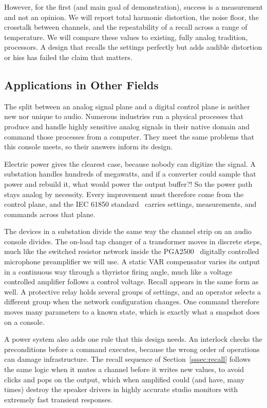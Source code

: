 \documentclass[11pt, letterpaper,titlepage]{article}
\begin{document}
However, for the first (and main goal of demonstration), success is a measurement and not an opinion. We will report total harmonic
distortion, the noise floor, the crosstalk between channels, and the
repeatability of a recall across a range of temperature. We will compare these values to existing, fully analog tradition, processors. A design that recalls the settings
perfectly but adds audible distortion or hiss has failed the claim that matters.

\subsection{Applications in Other Fields}
\label{ssec:other-fields}

The split between an analog signal plane and a digital control plane is neither
new nor unique to audio. Numerous industries run a physical processes that produce and handle highly sensitive analog signals in their native
domain and command those processes from a computer. They meet the same problems
that this console meets, so their answers inform its design.

Electric power gives the clearest case, because nobody can digitize the signal.
A substation handles hundreds of megawatts, and if a converter could sample that power
and rebuild it, what would power the output buffer?! So the power path stays analog by necessity. Every improvement
must therefore come from the control plane, and the IEC 61850 standard~\cite{iec61850} carries
settings, measurements, and commands across that plane.

The devices in a substation divide the same way the channel strip on an audio console divides. The
on-load tap changer of a transformer moves in discrete steps, much like the
switched resistor network inside the PGA2500~\cite{pga2500} digitally controlled microphone preamplifier we will use.
A static VAR compensator varies its output in a continuous way through a
thyristor firing angle, much like a voltage controlled amplifier follows a
control voltage. Recall appears in the same form as well. A protective relay
holds several groups of settings, and an operator selects a different group when
the network configuration changes. One command therefore moves many parameters
to a known state, which is exactly what a snapshot does on a console.

A power system also adds one rule that this design needs. An interlock checks
the preconditions before a command executes, because the wrong order of
operations can damage infrastructure. The recall sequence of Section~\ref{sssec:recall}
follows the same logic when it mutes a channel before it writes new values, to avoid clicks and pops on the output, which when amplified could (and have, many times) destroy the speaker drivers in highly accurate studio monitors with extremely fast transient responses.
\end{document}
